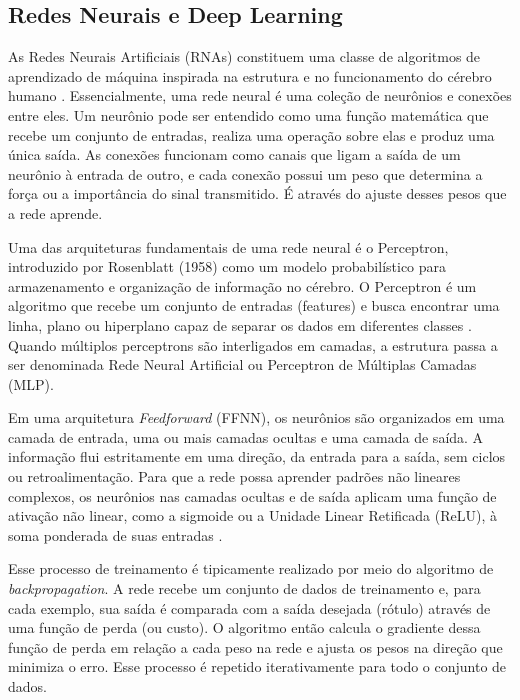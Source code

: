 \subsection{Redes Neurais e Deep Learning}

As Redes Neurais Artificiais (RNAs) constituem uma classe de algoritmos de aprendizado de máquina inspirada na estrutura e no funcionamento do cérebro humano . Essencialmente, uma rede neural é uma coleção de neurônios e conexões entre eles. Um neurônio pode ser entendido como uma função matemática que recebe um conjunto de entradas, realiza uma operação sobre elas e produz uma única saída. As conexões funcionam como canais que ligam a saída de um neurônio à entrada de outro, e cada conexão possui um peso que determina a força ou a importância do sinal transmitido. É através do ajuste desses pesos que a rede aprende.

Uma das arquiteturas fundamentais de uma rede neural é o Perceptron, introduzido por Rosenblatt (1958) como um modelo probabilístico para armazenamento e organização de informação no cérebro. O Perceptron é um algoritmo que recebe um conjunto de entradas (features) e busca encontrar uma linha, plano ou hiperplano capaz de separar os dados em diferentes classes . Quando múltiplos perceptrons são interligados em camadas, a estrutura passa a ser denominada Rede Neural Artificial ou Perceptron de Múltiplas Camadas (MLP).

Em uma arquitetura \textit{Feedforward} (FFNN), os neurônios são organizados em uma camada de entrada, uma ou mais camadas ocultas e uma camada de saída. A informação flui estritamente em uma direção, da entrada para a saída, sem ciclos ou retroalimentação. Para que a rede possa aprender padrões não lineares complexos, os neurônios nas camadas ocultas e de saída aplicam uma função de ativação não linear, como a sigmoide ou a Unidade Linear Retificada (ReLU), à soma ponderada de suas entradas .

Esse processo de treinamento é tipicamente realizado por meio do algoritmo de \textit{backpropagation}. A rede recebe um conjunto de dados de treinamento e, para cada exemplo, sua saída é comparada com a saída desejada (rótulo) através de uma função de perda (ou custo). O algoritmo então calcula o gradiente dessa função de perda em relação a cada peso na rede e ajusta os pesos na direção que minimiza o erro. Esse processo é repetido iterativamente para todo o conjunto de dados.


